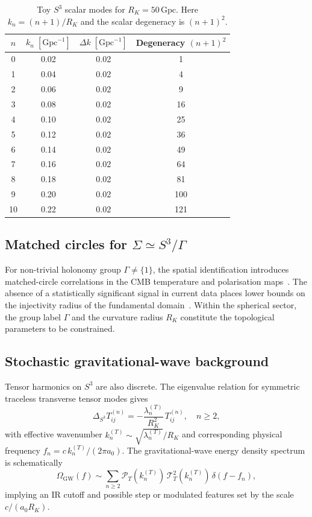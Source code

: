\documentclass[12pt,a4paper]{article}
\newcommand{\Sig}{\Sigma}           %
\newcommand{\RK}{R_K}
\begin{document}
\begin{table}[t]
\centering
\caption{Toy $S^3$ scalar modes for $\RK = 50\,\mathrm{Gpc}$.
  Here $k_n = (n+1)/\RK$ and the scalar degeneracy is
  $(n+1)^2$.}
\label{tab:modes}
\begin{tabular}{@{}cccc@{}}
\toprule
$n$ & $k_n\;[\mathrm{Gpc}^{-1}]$ &
      $\Delta k\;[\mathrm{Gpc}^{-1}]$ &
      Degeneracy $(n+1)^2$ \\
\midrule
0  & 0.02 & 0.02 & 1   \\
1  & 0.04 & 0.02 & 4   \\
2  & 0.06 & 0.02 & 9   \\
3  & 0.08 & 0.02 & 16  \\
4  & 0.10 & 0.02 & 25  \\
5  & 0.12 & 0.02 & 36  \\
6  & 0.14 & 0.02 & 49  \\
7  & 0.16 & 0.02 & 64  \\
8  & 0.18 & 0.02 & 81  \\
9  & 0.20 & 0.02 & 100 \\
10 & 0.22 & 0.02 & 121 \\
\bottomrule
\end{tabular}
\end{table}

\subsection{Matched circles for $\Sig \simeq S^3/\Gamma$}

For non-trivial holonomy group $\Gamma \neq \{1\}$, the
spatial identification introduces matched-circle
correlations in the CMB temperature and polarisation
maps~\cite{CornishSpergel1998}. The absence of a
statistically significant signal in current data places
lower bounds on the injectivity radius of the fundamental
domain~\cite{Planck2015topology,COMPACT2024lens,COMPACT2024promise}.
Within the spherical sector, the group label $\Gamma$
and the curvature radius $\RK$ constitute the topological
parameters to be constrained.

\subsection{Stochastic gravitational-wave background}

Tensor harmonics on $S^3$ are also discrete. The
eigenvalue relation for symmetric traceless transverse
tensor modes gives
\begin{equation}
  \Delta_{S^3} T^{(n)}_{ij}
  = -\frac{\lambda_n^{(T)}}{\RK^2}\,T^{(n)}_{ij},
  \quad n \geq 2,
  \label{eq:tensor}
\end{equation}
with effective wavenumber $k_n^{(T)} \sim
\sqrt{\lambda_n^{(T)}}/\RK$ and corresponding physical
frequency $f_n = c\,k_n^{(T)}/(2\pi a_0)$. The
gravitational-wave energy density spectrum is
schematically
\begin{equation}
  \Omega_{\mathrm{GW}}(f)
  \sim \sum_{n\geq 2}
  \mathcal{P}_T(k_n^{(T)})\,\mathcal{T}^2_T(k_n^{(T)})
  \,\delta(f - f_n),
  \label{eq:OGW}
\end{equation}
implying an IR cutoff and possible step or modulated
features set by the scale $c/(a_0\RK)$.
\end{document}
